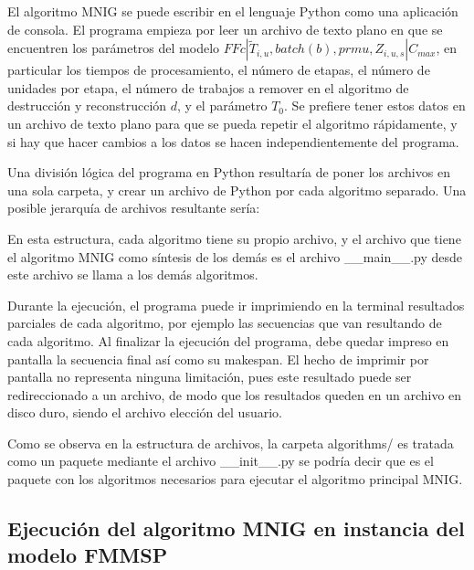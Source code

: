 \documentclass{article}
\def\notac_modelo{$FFc | \tilde{T}_{i, u}, batch(b), prmu, Z_{i, u, s} | C_{max}$}
\begin{document}
El algoritmo MNIG se puede escribir en el lenguaje Python como una aplicación de consola. El programa empieza por leer un archivo de texto plano en que se encuentren los parámetros del modelo \notac_modelo, en particular los tiempos de procesamiento, el número de etapas, el número de unidades por etapa, el número de trabajos a remover en el algoritmo de destrucción y reconstrucción $d$, y el parámetro $T_{0}$. Se prefiere tener estos datos en un archivo de texto plano para que se pueda repetir el algoritmo rápidamente, y si hay que hacer cambios a los datos se hacen independientemente del programa.

\vspace{\baselineskip}
Una división lógica del programa en Python resultaría de poner los archivos en una sola carpeta, y crear un archivo de Python por cada algoritmo separado. Una posible jerarquía de archivos resultante sería:

\vspace{\baselineskip}

\vspace{\baselineskip}
En esta estructura, cada algoritmo tiene su propio archivo, y el archivo que tiene el algoritmo MNIG como síntesis de los demás es el archivo \_\_main\_\_.py desde este archivo se llama a los demás algoritmos.

\vspace{\baselineskip}
Durante la ejecución, el programa puede ir imprimiendo en la terminal resultados parciales de cada algoritmo, por ejemplo las secuencias que van resultando de cada algoritmo. Al finalizar la ejecución del programa, debe quedar impreso en pantalla la secuencia final así como su makespan. El hecho de imprimir por pantalla no representa ninguna limitación, pues este resultado puede ser redireccionado a un archivo, de modo que los resultados queden en un archivo en disco duro, siendo el archivo elección del usuario.

\vspace{\baselineskip}
Como se observa en la estructura de archivos, la carpeta algorithms/ es tratada como un paquete mediante el archivo \_\_init\_\_.py se podría decir que es el paquete con los algoritmos necesarios para ejecutar el algoritmo principal MNIG.

\subsection{Ejecución del algoritmo MNIG en instancia del modelo FMMSP}
\end{document}
